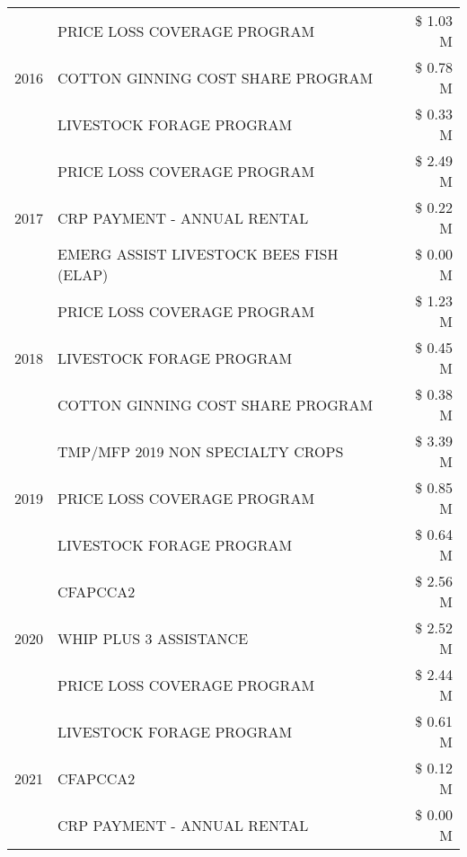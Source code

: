 \begin{tabular}{llr}
\multirow[t]{3}{*}{2016} & PRICE LOSS COVERAGE PROGRAM & \$ 1.03 M \\
 & COTTON GINNING COST SHARE PROGRAM & \$ 0.78 M \\
 & LIVESTOCK FORAGE PROGRAM & \$ 0.33 M \\
\cline{1-3}
\multirow[t]{3}{*}{2017} & PRICE LOSS COVERAGE PROGRAM & \$ 2.49 M \\
 & CRP PAYMENT - ANNUAL RENTAL & \$ 0.22 M \\
 & EMERG ASSIST LIVESTOCK BEES FISH (ELAP) & \$ 0.00 M \\
\cline{1-3}
\multirow[t]{3}{*}{2018} & PRICE LOSS COVERAGE PROGRAM & \$ 1.23 M \\
 & LIVESTOCK FORAGE PROGRAM & \$ 0.45 M \\
 & COTTON GINNING COST SHARE PROGRAM & \$ 0.38 M \\
\cline{1-3}
\multirow[t]{3}{*}{2019} & TMP/MFP 2019 NON SPECIALTY CROPS & \$ 3.39 M \\
 & PRICE LOSS COVERAGE PROGRAM & \$ 0.85 M \\
 & LIVESTOCK FORAGE PROGRAM & \$ 0.64 M \\
\cline{1-3}
\multirow[t]{3}{*}{2020} & CFAPCCA2 & \$ 2.56 M \\
 & WHIP PLUS 3 ASSISTANCE & \$ 2.52 M \\
 & PRICE LOSS COVERAGE PROGRAM & \$ 2.44 M \\
\cline{1-3}
\multirow[t]{3}{*}{2021} & LIVESTOCK FORAGE PROGRAM & \$ 0.61 M \\
 & CFAPCCA2 & \$ 0.12 M \\
 & CRP PAYMENT - ANNUAL RENTAL & \$ 0.00 M \\
\cline{1-3}
\bottomrule
\end{tabular}
